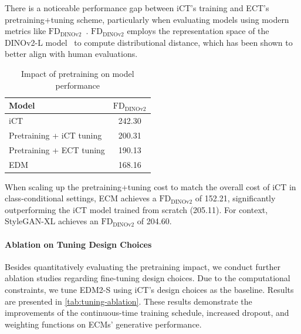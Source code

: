 There is a noticeable performance gap between iCT's training and ECT's pretraining+tuning scheme, particularly when evaluating models using modern metrics like $\mathrm{FD}_{\text{DINOv2}}$~\citep{fd_dino}.  $\mathrm{FD}_{\text{DINOv2}}$ employs the representation space of the DINOv2-L model~\citep{oquab2023dinov2} to compute distributional distance, which has been shown to better align with human evaluations.

\begin{table}[h]
\centering
\caption{Impact of pretraining on model performance}
\vspace{5pt}
\label{tab:pretraining-impact}
\begin{tabular}{lc}
\toprule
Model & $\mathrm{FD}_{\text{DINOv2}}$ \\
\midrule
iCT                       & 242.30 \\
Pretraining + iCT tuning  & 200.31 \\
Pretraining + ECT tuning  & 190.13 \\
EDM                       & 168.16 \\
\bottomrule
\end{tabular}
\vspace{10pt}
\end{table}

When scaling up the pretraining+tuning cost to match the overall cost of iCT in class-conditional settings, ECM achieves a $\mathrm{FD}_{\text{DINOv2}}$ of 152.21, significantly outperforming the iCT model trained from scratch (205.11). For context, StyleGAN-XL achieves an $\mathrm{FD}_{\text{DINOv2}}$ of 204.60.



\paragraph{Ablation on Tuning Design Choices}
Besides quantitatively evaluating the pretraining impact, we conduct further ablation studies regarding fine-tuning design choices. Due to the computational constraints, we tune EDM2-S using iCT's design choices as the baseline.  Results are presented in \cref{tab:tuning-ablation}. These results demonstrate the improvements of the continuous-time training schedule, increased dropout, and weighting functions on ECMs' generative performance.

